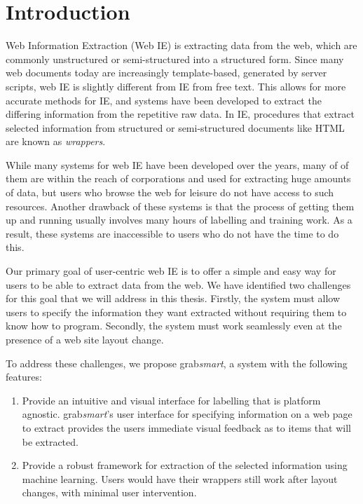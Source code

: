 \section{Introduction}
Web Information Extraction (Web IE) is extracting data from the web,
which are commonly unstructured or semi-structured into a structured form.
Since many web documents today are increasingly template-based, generated by server scripts,
 web IE is slightly different from IE
from free text. This allows for more accurate methods for IE, and systems have been developed
to extract the differing information from the repetitive raw data.
In IE, procedures that extract selected information from structured or semi-structured
documents like HTML are known as \textit{wrappers}.

While many systems for web IE have been developed over the years, many of
of them are within the reach of
corporations and used for extracting huge amounts of data,
but users who browse the web for leisure do not have access to such resources.
Another drawback of these systems is that the process of getting them up and running usually
involves many hours of labelling and training work. As a result, these systems are inaccessible
to users who do not have the time to do this. 

Our primary goal of user-centric web IE is to offer a simple and easy way for users
to be able to extract data from the web. We have identified two challenges for this goal that we will address in this thesis.
Firstly, the system must allow users to specify the information
they want extracted without requiring them to know how to program.
Secondly, the system must work seamlessly even at the presence of a web site layout
change.

To address these challenges, we propose
grab\textit{smart}, a system with the following features:
	\begin{enumerate}
		\item Provide an intuitive and visual interface for labelling that is platform agnostic.
		grab\textit{smart}'s user interface for specifying information on a web page to extract
		 provides the users immediate visual feedback as to items that will be extracted.
		\item Provide a robust framework for extraction of the selected information using
		machine learning. Users would have their wrappers still work after layout changes, with minimal
		user intervention.
	\end{enumerate}